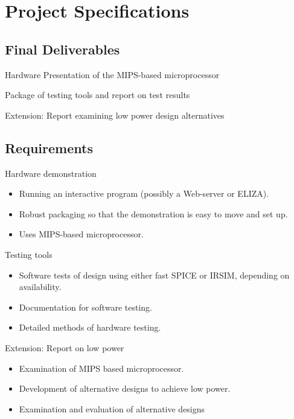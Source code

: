 \documentclass[a4paper,12pt]{article}
\begin{document}
\section{Project Specifications}

\subsection{Final Deliverables}
\begin{enumerate}[{[D}1{]}]
\item Hardware Presentation of the MIPS-based microprocessor
\item Package of testing tools and report on test results
\item Extension: Report examining low power design alternatives
\end{enumerate}

\subsection{Requirements}
\begin{enumerate}[{[R}1{]}]
\item Hardware demonstration
  \begin{itemize}
  \item Running an interactive program (possibly a Web-server or
    ELIZA).
  \item Robust packaging so that the demonstration is easy to
    move and set up.  
  \item Uses MIPS-based microprocessor.
  \end{itemize}

\item Testing tools
  \begin{itemize}
    \item Software tests of design using either fast SPICE or IRSIM,
      depending on availability.
    \item Documentation for software testing.
    \item Detailed methods of hardware testing.
  \end{itemize}
\item Extension: Report on low power
  \begin{itemize}
  \item Examination of MIPS based microprocessor.
  \item Development of alternative designs to achieve low power.
  \item Examination and evaluation of alternative designs
  \end{itemize}
\end{enumerate}
\end{document}
